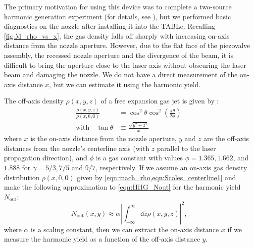 The primary motivation for using this device was to complete a two-source harmonic generation experiment (for details, see \cite{hagemanComplexAttosecondTransientAbsorption2020}), but we performed basic diagnostics on the nozzle after installing it into the TABLe. Recalling \cref{fig:M_rho_vs_x}, the gas density falls off sharply with increasing on-axis distance from the nozzle aperture. However, due to the flat face of the piezovalve assembly, the recessed nozzle aperture and the divergence of the beam, it is difficult to bring the aperture close to the laser axis without obscuring the laser beam and damaging the nozzle. We do not have a direct measurement of the on-axis distance $x$, but we can estimate it using the harmonic yield.

The off-axis density $\rho(x,y,z)$ of a free expansion gas jet is given by \cite{millerFreeJetSources1988}:
\begin{align}
\frac{\rho(x,y,z)}{\rho(x,0,0)} &= \cos^2 \theta \cos^2 \left( \frac{\pi \theta}{2 \phi} \right) \\
\textrm{with} \quad \tan \theta &\equiv \frac{\sqrt{y^2+z^2}}{x}
\label{eqn:off-axis-density}
\end{align}
where $x$ is the on-axis distance from the nozzle aperture, $y$ and $z$ are the off-axis distances from the nozzle's centerline axis (with $z$ parallel to the laser propagation direction), and $\phi$ is a gas constant with values ${\phi = 1.365, 1.662}$, and $1.888$ for ${\gamma = 5/3, 7/5}$ and $9/7$, respectively. If we assume an on-axis gas density distribution $\rho(x,0,0)$ given by \cref{eqn:mach_rho,eqn:Scoles_centerline1} and make the following approximation to \cref{eqn:HHG_Nout} for the harmonic yield $N_{\textrm{out}}$:
\begin{equation}
N_{\textrm{out}}(x, y) \approx \alpha \left| \int_{-\infty}^{\infty} \dd{z} \rho(x,y,z) \right|^2 \textrm{,}
\label{eqn:Nout_approx}
\end{equation}
where $\alpha$ is a scaling constant, then we can extract the on-axis distance $x$ if we measure the harmonic yield as a function of the off-axis distance $y$.

